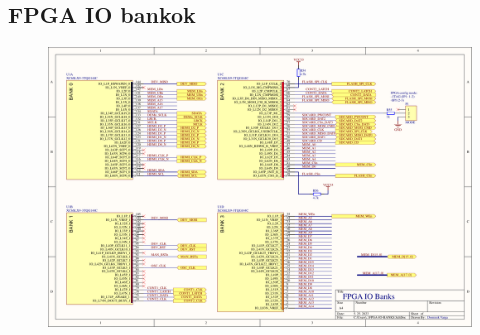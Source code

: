 \subsection{FPGA IO bankok}
\begin{figure}[H]
	\centering
	\includegraphics[width=220mm, keepaspectratio, angle=90]{figures/FPGA-BANKS}
	\label{fig:FPGA-BANKS}
\end{figure}
